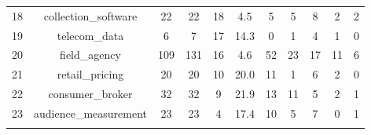 \begin{table}[!htbp]
\begin{tabular}{@{\extracolsep{5pt}} ccccccccccc}
18 & collection\_software &  22 &  22 & 18 &  4.5 &  5 &  5 &  8 &  2 &  2 \\ 
19 & telecom\_data &   6 &   7 & 17 & 14.3 &  0 &  1 &  4 &  1 &  0 \\ 
20 & field\_agency & 109 & 131 & 16 &  4.6 & 52 & 23 & 17 & 11 &  6 \\ 
21 & retail\_pricing &  20 &  20 & 10 & 20.0 & 11 &  1 &  6 &  2 &  0 \\ 
22 & consumer\_broker &  32 &  32 &  9 & 21.9 & 13 & 11 &  5 &  2 &  1 \\ 
23 & audience\_measurement &  23 &  23 &  4 & 17.4 & 10 &  5 &  7 &  0 &  1 \\ 
\hline \\[-1.8ex] 
\end{tabular} 
\end{table} 
